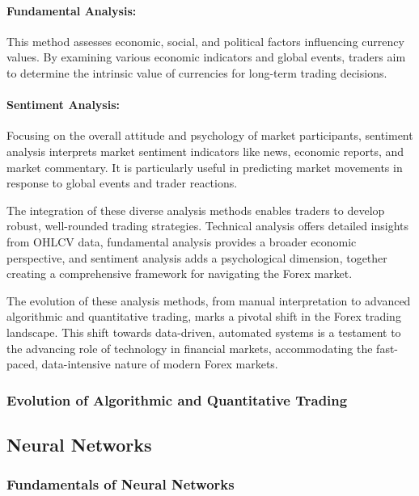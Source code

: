 

\paragraph{Fundamental Analysis:}
This method assesses economic, social, and political factors influencing currency values. By examining various economic indicators and global events, traders aim to determine the intrinsic value of currencies for long-term trading decisions.

\paragraph{Sentiment Analysis:}
Focusing on the overall attitude and psychology of market participants, sentiment analysis interprets market sentiment indicators like news, economic reports, and market commentary. It is particularly useful in predicting market movements in response to global events and trader reactions.

The integration of these diverse analysis methods enables traders to develop robust, well-rounded trading strategies. Technical analysis offers detailed insights from OHLCV data, fundamental analysis provides a broader economic perspective, and sentiment analysis adds a psychological dimension, together creating a comprehensive framework for navigating the Forex market.

The evolution of these analysis methods, from manual interpretation to advanced algorithmic and quantitative trading, marks a pivotal shift in the Forex trading landscape. This shift towards data-driven, automated systems is a testament to the advancing role of technology in financial markets, accommodating the fast-paced, data-intensive nature of modern Forex markets.

\subsubsection{Evolution of Algorithmic and Quantitative Trading}

\subsection{Neural Networks}

\subsubsection{Fundamentals of Neural Networks}

